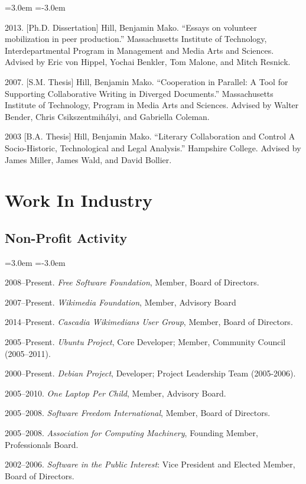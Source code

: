 \documentclass[10pt]{article}
\newenvironment{cvlist}{
\begin{list}{}{\leftmargin=3.0em \itemindent=-3.0em}
  \setlength{\itemsep}{0pt}
  \setlength{\parskip}{0em}
  \setlength{\parsep}{1em}
  \setlength{\parindent}{0em}}
{\vspace{1em}
\end{list}}
\begin{document}
\begin{cvlist}
\item 2013. [Ph.D. Dissertation] Hill, Benjamin Mako. ``Essays on volunteer mobilization in peer production.'' Massachusetts Institute of Technology, Interdepartmental Program in Management and Media Arts and Sciences. Advised by Eric von Hippel, Yochai Benkler, Tom Malone, and Mitch Resnick.
\item 2007. [S.M. Thesis] Hill, Benjamin Mako. ``Cooperation in Parallel: A Tool for Supporting Collaborative Writing in Diverged Documents.'' Massachusetts Institute of Technology, Program in Media Arts and Sciences. Advised by Walter Bender, Chris Csikszentmihályi, and Gabriella Coleman.
\item 2003 [B.A. Thesis] Hill, Benjamin Mako. ``Literary Collaboration and Control A Socio-Historic, Technological and Legal Analysis.'' Hampshire College. Advised by James Miller, James Wald, and David Bollier.
\end{cvlist}

\section{Work In Industry}

\subsection{Non-Profit Activity}
\begin{cvlist}
\item 2008--Present. \emph{Free Software Foundation}, Member, Board of Directors.
\item 2007--Present. \emph{Wikimedia Foundation}, Member, Advisory Board
\item 2014--Present. \emph{Cascadia Wikimedians User Group}, Member, Board of Directors.
\item 2005--Present. \emph{Ubuntu Project}, Core Developer; Member, Community Council (2005--2011).
\item 2000--Present. \emph{Debian Project}, Developer; Project Leadership Team (2005-2006).
\item 2005--2010. \emph{One Laptop Per Child}, Member, Advisory Board. %
\item 2005--2008. \emph{Software Freedom International}, Member, Board of Directors.
\item 2005--2008. \emph{Association for Computing Machinery}, Founding Member, Professionals Board.
\item 2002--2006. \emph{Software in the Public Interest}: Vice President and Elected Member, Board of Directors.
\end{cvlist}
\end{document}
